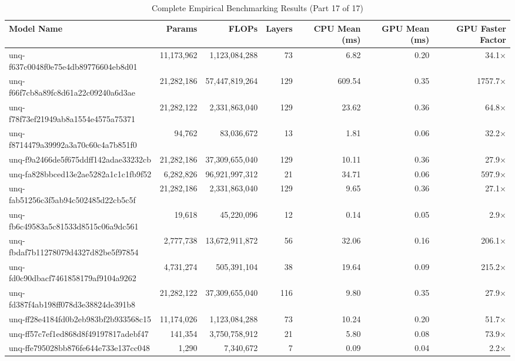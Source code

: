 \begin{table}[h!]
\centering
\fontsize{7}{9}\selectfont
\begin{tabular}{lrrrrrr}
\toprule
\textbf{Model Name} & \textbf{Params} & \textbf{FLOPs} & \textbf{Layers} & \textbf{CPU Mean (ms)} & \textbf{GPU Mean (ms)} & \textbf{GPU Faster Factor} \\
\midrule
unq-f637c0048f0e75e4db89776604eb8d01 & 11,173,962 & 1,123,084,288 & 73 & 6.82 & 0.20 & 34.1$\times$ \\
unq-f66f7cb8a89fc8d61a22c09240a6d3ae & 21,282,186 & 57,447,819,264 & 129 & 609.54 & 0.35 & 1757.7$\times$ \\
unq-f78f73ef21949ab8a1554e4575a75371 & 21,282,122 & 2,331,863,040 & 129 & 23.62 & 0.36 & 64.8$\times$ \\
unq-f8714479a39992a3a70c60c4a7b851f0 & 94,762 & 83,036,672 & 13 & 1.81 & 0.06 & 32.2$\times$ \\
unq-f9a2466de5f675ddff142adae33232cb & 21,282,186 & 37,309,655,040 & 129 & 10.11 & 0.36 & 27.9$\times$ \\
unq-fa828bbced13e2ae5282a1c1c1fb9f52 & 6,282,826 & 96,921,997,312 & 21 & 34.71 & 0.06 & 597.9$\times$ \\
unq-fab51256c3f5ab94c502485d22cb5c5f & 21,282,186 & 2,331,863,040 & 129 & 9.65 & 0.36 & 27.1$\times$ \\
unq-fb6c49583a5c81533d8515c06a9dc561 & 19,618 & 45,220,096 & 12 & 0.14 & 0.05 & 2.9$\times$ \\
unq-fbdaf7b11278079d4327d82be5f97854 & 2,777,738 & 13,672,911,872 & 56 & 32.06 & 0.16 & 206.1$\times$ \\
unq-fd0c90dbacf7461858179af9104a9262 & 4,731,274 & 505,391,104 & 38 & 19.64 & 0.09 & 215.2$\times$ \\
unq-fd387f4ab198ff078d3e38824de391b8 & 21,282,122 & 37,309,655,040 & 116 & 9.80 & 0.35 & 27.9$\times$ \\
unq-ff28e4184fd0b2eb983bf2b933568c15 & 11,174,026 & 1,123,084,288 & 73 & 10.24 & 0.20 & 51.7$\times$ \\
unq-ff57c7ef1ed868d8f49197817adebf47 & 141,354 & 3,750,758,912 & 21 & 5.80 & 0.08 & 73.9$\times$ \\
unq-ffe795028bb876fe644e733e137cc048 & 1,290 & 7,340,672 & 7 & 0.09 & 0.04 & 2.2$\times$ \\
\bottomrule
\end{tabular}
\caption{Complete Empirical Benchmarking Results (Part 17 of 17)}
\end{table}

\clearpage

